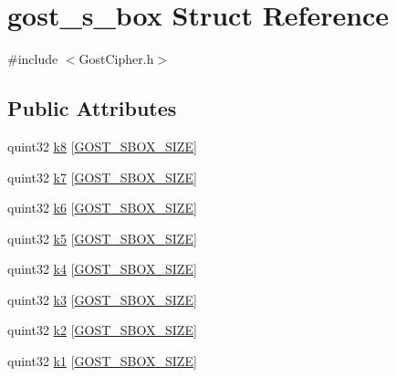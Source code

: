 \hypertarget{structgost__s__box}{}\section{gost\+\_\+s\+\_\+box Struct Reference}
\label{structgost__s__box}


{\ttfamily \#include $<$Gost\+Cipher.\+h$>$}

\subsection*{Public Attributes}
\begin{DoxyCompactItemize}
\item 
quint32 \hyperlink{structgost__s__box_a38754c1b41b814aa756cd9a1f1e9a5e6}{k8} \mbox{[}\hyperlink{_gost_cipher_8h_aa62d143b3b91c5333e7835aaf1c3b2de}{G\+O\+S\+T\+\_\+\+S\+B\+O\+X\+\_\+\+S\+I\+ZE}\mbox{]}
\item 
quint32 \hyperlink{structgost__s__box_afab1bdca9bccc878fd8ca5087df305b4}{k7} \mbox{[}\hyperlink{_gost_cipher_8h_aa62d143b3b91c5333e7835aaf1c3b2de}{G\+O\+S\+T\+\_\+\+S\+B\+O\+X\+\_\+\+S\+I\+ZE}\mbox{]}
\item 
quint32 \hyperlink{structgost__s__box_a80070ee6ff40dc8ebd0d50abcb805369}{k6} \mbox{[}\hyperlink{_gost_cipher_8h_aa62d143b3b91c5333e7835aaf1c3b2de}{G\+O\+S\+T\+\_\+\+S\+B\+O\+X\+\_\+\+S\+I\+ZE}\mbox{]}
\item 
quint32 \hyperlink{structgost__s__box_a43d62025a331257c4c36d7e939ce5a7c}{k5} \mbox{[}\hyperlink{_gost_cipher_8h_aa62d143b3b91c5333e7835aaf1c3b2de}{G\+O\+S\+T\+\_\+\+S\+B\+O\+X\+\_\+\+S\+I\+ZE}\mbox{]}
\item 
quint32 \hyperlink{structgost__s__box_a65e5654482ffb03ba835b7953e71d395}{k4} \mbox{[}\hyperlink{_gost_cipher_8h_aa62d143b3b91c5333e7835aaf1c3b2de}{G\+O\+S\+T\+\_\+\+S\+B\+O\+X\+\_\+\+S\+I\+ZE}\mbox{]}
\item 
quint32 \hyperlink{structgost__s__box_ac297a9acd3981830afca19b711b3eefe}{k3} \mbox{[}\hyperlink{_gost_cipher_8h_aa62d143b3b91c5333e7835aaf1c3b2de}{G\+O\+S\+T\+\_\+\+S\+B\+O\+X\+\_\+\+S\+I\+ZE}\mbox{]}
\item 
quint32 \hyperlink{structgost__s__box_aaf6934ab0ba46babb815c0283c421640}{k2} \mbox{[}\hyperlink{_gost_cipher_8h_aa62d143b3b91c5333e7835aaf1c3b2de}{G\+O\+S\+T\+\_\+\+S\+B\+O\+X\+\_\+\+S\+I\+ZE}\mbox{]}
\item 
quint32 \hyperlink{structgost__s__box_a8bc525703cffca48fe5249ec7cd6b7df}{k1} \mbox{[}\hyperlink{_gost_cipher_8h_aa62d143b3b91c5333e7835aaf1c3b2de}{G\+O\+S\+T\+\_\+\+S\+B\+O\+X\+\_\+\+S\+I\+ZE}\mbox{]}
\end{DoxyCompactItemize}


